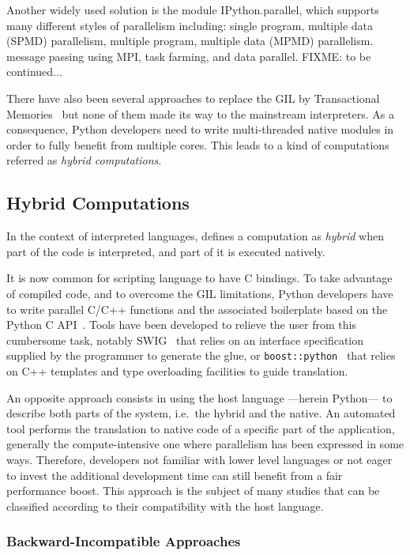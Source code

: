 \documentclass[conference]{IEEEtran}
\begin{document}
Another widely used solution is the module IPython.parallel, which supports many
different styles of parallelism including: single program, multiple data (SPMD)
parallelism, multiple program, multiple data (MPMD) parallelism. message passing
using MPI, task farming, and data parallel.
FIXME: to be continued...

There have also been several approaches to replace the GIL by Transactional
Memories~\cite{Riley2006,Tabba2010} but none of them made its way to the
mainstream interpreters. As a consequence, Python developers need to write
multi-threaded native modules in order to fully benefit from multiple cores.
This leads to a kind of computations referred as \emph{hybrid computations}.


\subsection{Hybrid Computations}

In the context of interpreted languages, \cite{dongara2007} defines a
computation as \emph{hybrid} when part of the code is interpreted, and part of
it is executed natively.

It is now common for scripting language to have C bindings. To take advantage of
compiled code, and to overcome the GIL limitations, Python developers have to
write parallel C/C++ functions and the associated boilerplate based on the
Python C API~\cite{pythoncapi}. Tools have been developed to relieve the user
from this cumbersome task, notably SWIG~\cite{swig2003} that relies on an
interface specification supplied by the programmer to generate the glue, or
\texttt{boost::python}~\cite{boostpython2007} that relies on C++ templates and
type overloading facilities to guide translation.

An opposite approach consists in using the host language ---herein Python--- to
describe both parts of the system, i.e.\ the hybrid and the native. An automated
tool performs the translation to native code of a specific part of the
application, generally the compute-intensive one where parallelism has been
expressed in some ways.
Therefore, developers not familiar with lower level languages or not eager to
invest the additional development time can still benefit from a fair performance
boost.
This approach is the subject of many studies that can be classified according to
their compatibility with the host language.

\subsubsection{Backward-Incompatible Approaches}
\end{document}
